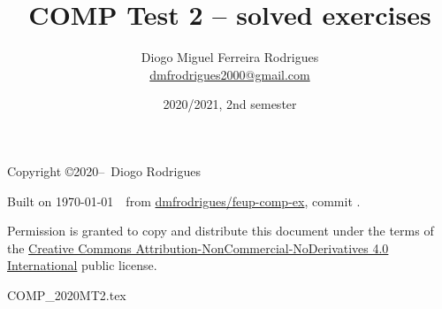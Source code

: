 \documentclass{comp}
\title{COMP Test 2 -- solved exercises}
\author{Diogo Miguel Ferreira Rodrigues \\ \href{mailto:dmfrodrigues2000@gmail.com}{dmfrodrigues2000@gmail.com}}
\date{2020/2021, 2nd semester}
\begin{document}
\maketitle
\begin{secondpage}
    Copyright \copyright 2020--\the\year\ Diogo Rodrigues\par
    \par
    \immediate{}
    Built on \today~\currenttime~from \href{https://github.com/dmfrodrigues/feup-comp-ex}{dmfrodrigues/feup-comp-ex}, commit \unskip.\par
    Permission is granted to copy and distribute this document under the terms of the
    \href{https://creativecommons.org/licenses/by-nc-nd/4.0/}{Creative Commons Attribution-NonCommercial-NoDerivatives 4.0 International}
    public license.
\end{secondpage}
\frontmatter
\tableofcontents
\mainmatter
{COMP_2020MT2.tex}
\end{document}
